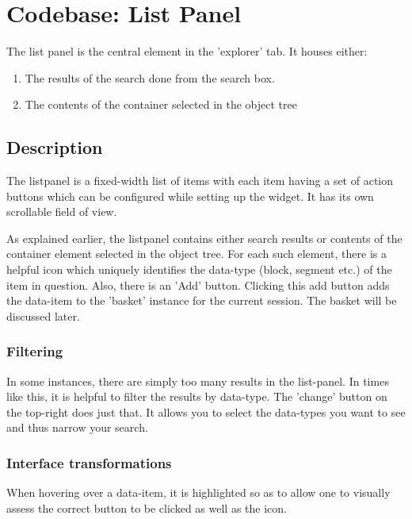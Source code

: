 \chapter{Codebase: List Panel}

The list panel is the central element in the 'explorer' tab.  It
houses either:

\begin{enumerate}
  \item The results of the search done from the search box.
  \item The contents of the container selected in the object tree
\end{enumerate}

\section{Description}

The listpanel is a fixed-width list of items with each item having a
set of action buttons which can be configured while setting up the
widget.  It has its own scrollable field of view.

As explained earlier, the listpanel contains either search results or
contents of the container element selected in the object tree.  For
each such element, there is a helpful icon which uniquely identifies
the data-type (block, segment etc.) of the item in question.  Also,
there is an 'Add' button.  Clicking this add button adds the data-item
to the 'basket' instance for the current session.  The basket will be
discussed later.

\subsection{Filtering}

In some instances, there are simply too many results in the
list-panel.  In times like this, it is helpful to filter the results
by data-type.  The 'change' button on the top-right does just that.
It allows you to select the data-types you want to see and thus narrow
your search.

\subsection{Interface transformations}

When hovering over a data-item, it is highlighted so as to allow one
to visually assess the correct button to be clicked as well as the
icon.

